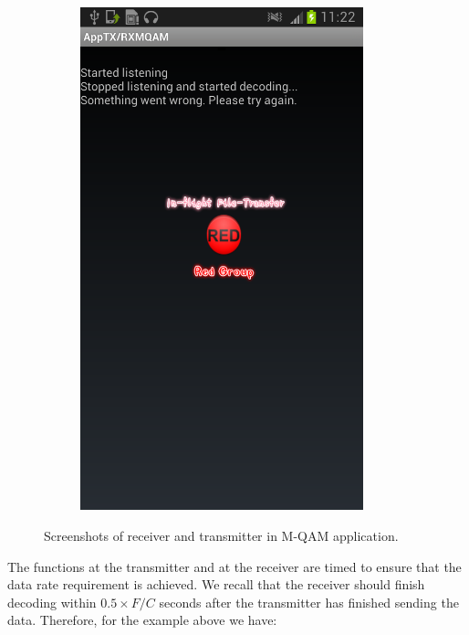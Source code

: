\documentclass[12pt,a4paper,openright]{report}
\begin{document}
\begin{figure}[H]
\begin{subfigure}{.3\textwidth}
         \includegraphics[width=0.9\textwidth]{somethingwentwrong.png}
         \label{fig:appRXsideError}
      \end{subfigure}
     \caption[Screenshots of receiver and transmitter in M-QAM application]{Screenshots of receiver and transmitter in M-QAM application.}
     \label{fig:screenshots}
 \end{figure} 


The functions at the transmitter and at the receiver are timed to ensure that the data rate requirement is achieved. We recall that the receiver should finish decoding within $0.5\times F/C$ seconds after the transmitter has finished sending the data. Therefore, for the example above we have:
\end{document}
